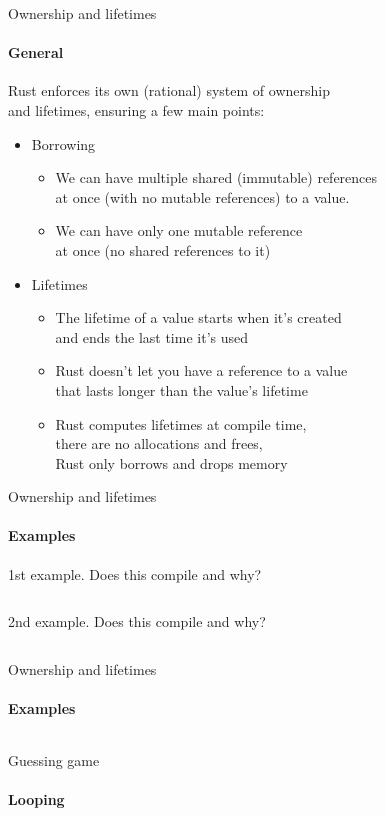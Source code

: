 \documentclass[usenames,dvipsnames,10pt,aspectratio=169]{beamer}
\begin{document}
\begin{frame}{Ownership and lifetimes}
	\framesubtitle{General}
	\normalsize
	Rust enforces its own (rational) system of ownership\\
	and lifetimes, ensuring a few main points:
	\begin{itemize}[label=$\bullet$]
		\item Borrowing
		\begin{itemize}[label=$\bullet$]
			\item We can have multiple shared (immutable) references\\
				at once (with no mutable references) to a value.
			\item We can have only one mutable reference\\
				at once (no shared references to it)
		\end{itemize}
		\item Lifetimes
		\begin{itemize}[label=$\bullet$]
			\item The lifetime of a value starts when it’s created\\
				and ends the last time it’s used
			\item Rust doesn’t let you have a reference to a value\\
				that lasts longer than the value’s lifetime
			\item Rust computes lifetimes at compile time,\\
				there are no allocations and frees,\\
				Rust only borrows and drops memory
		\end{itemize}
	\end{itemize}
\end{frame}

\begin{frame}{Ownership and lifetimes}
	\framesubtitle{Examples}
	1st example. Does this compile and why?
	\inputminted[fontsize=\normalsize]{c}{code/own1.rs}
	\vspace{0.6cm}
	2nd example. Does this compile and why?
	\inputminted[fontsize=\normalsize]{c}{code/own2.rs}
\end{frame}

\begin{frame}{Ownership and lifetimes}
	\framesubtitle{Examples}
	\inputminted[fontsize=\large]{c}{code/own3.rs}
\end{frame}

\begin{frame}{Guessing game}
	\framesubtitle{Looping}
	\inputminted[fontsize=\normalsize]{c}{code/guess5.rs}
\end{frame}
\end{document}
